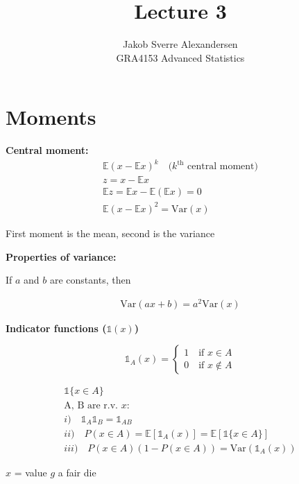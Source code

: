 \documentclass[10pt]{article}
\begin{document}
 
\title{Lecture 3}
\author{Jakob Sverre Alexandersen\\
GRA4153 Advanced Statistics}
\maketitle

\tableofcontents
\newpage

\section{Moments}

\textbf{Central moment:}
\begin{align*}
    \mathbb{E}(x-\mathbb{E}x)^k \quad\text{($k^{\text{th}}$ central moment)}\\
    z = x - \mathbb{E}x \\
    \mathbb{E}z = \mathbb{E}x - \mathbb{E}(\mathbb{E}x) = 0 \\
    \mathbb{E}(x - \mathbb{E}x)^2 = \text{Var} (x)
\end{align*}

First moment is the mean, second is the variance 

\hfill

\textbf{Properties of variance:}

If $a$ and $b$ are constants, then 

\begin{align*}
    \text{Var}(ax + b) = a^2 \text{Var}(x)
\end{align*}

\textbf{Indicator functions ($\mathbb{1}(x)$)}

\[
\mathbb{1}_A(x) = 
\begin{cases}
    1 \quad\text{if } x \in A \\
    0 \quad\text{if } x \notin A
\end{cases}
\]

\begin{align*}
    \mathbb{1} \{x \in A\} \\
    \text{A, B are r.v. }x: \\
    i) \quad \mathbb{1}_A \mathbb{1}_B = \mathbb{1}_{AB} \\
    ii) \quad P(x \in A) = \mathbb{E}[\mathbb{1}_A(x)] = \mathbb{E}[\mathbb{1}\{x \in A\}] \\
    iii) \quad P(x \in A)(1 - P(x \in A)) = \text{Var}(\mathbb{1}_A(x))
\end{align*}

$x$ = value $g$ a fair die 
\end{document}
